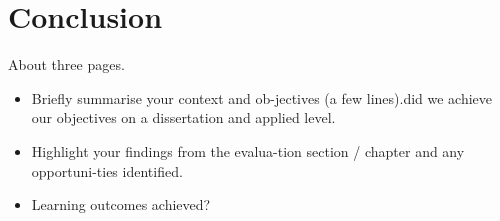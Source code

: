 \chapter{Conclusion}
About three pages.

\begin{itemize}
\item Briefly summarise your context and ob-jectives (a few lines).did we achieve our objectives on a dissertation and applied level.
\item Highlight your findings from the evalua-tion section / chapter and any opportuni-ties identified.
\item Learning outcomes achieved?
\end{itemize}
